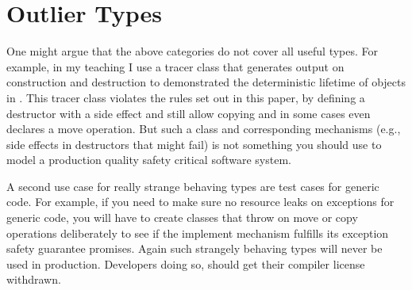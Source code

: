 \documentclass[ebook,11pt,article]{memoir}
\begin{document}
\section{Outlier Types}
One might argue that the above categories do not cover all useful \Cpp{} types. For example, in my teaching I use a tracer class that generates output on construction and destruction to demonstrated the deterministic lifetime of objects in \Cpp{}. This tracer class violates the rules set out in this paper, by defining a destructor with a side effect and still allow copying and in some cases even declares a move operation. But such a class and corresponding mechanisms (e.g., side effects in destructors that might fail) is not something you should use to model a production quality safety critical software system.

A second use case for really strange behaving types are test cases for generic code. For example, if you need to make sure no resource leaks on exceptions for generic code, you will have to create classes that throw on move or copy operations deliberately to see if the implement mechanism fulfills its exception safety guarantee promises. Again such strangely behaving types will never be used in production. Developers doing so, should get their compiler license withdrawn.
\end{document}
